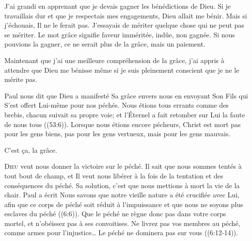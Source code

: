 J'ai grandi en apprenant que je devais gagner les bénédictions de Dieu.
 Si je travaillais dur et que je respectais mes engagements,
 Dieu allait me bénir. Mais si j'échouais, Il ne le ferait pas.
 J'essayais de mériter quelque chose qui ne peut pas se mériter.
 Le mot \Og grâce \Fg{} signifie \Og faveur imméritée, indûe,
 non gagnée. \Fg{} Si nous pouvions la gagner,
 ce ne serait plus de la grâce, mais un paiement.


Maintenant que j'ai une meilleure compréhension de la grâce,
 j'ai appris à attendre que Dieu me bénisse même si je suis pleinement
 conscient que je ne le mérite pas.

Paul nous dit que Dieu a manifesté Sa grâce envers nous en envoyant Son Fils
 qui S'est offert Lui-même pour nos péchés.
 \Og Nous étions tous errants comme des brebis, chacun suivait sa propre voie;
 et l'Éternel a fait retomber sur Lui la faute de nous tous \Fg{}
 ((53:6)).
 Lorsque nous étions encore pécheurs, Christ est mort
 \ocadr pas pour les gens biens, pas pour les gens vertueux,
 mais pour les gens mauvais.

C'est \c{c}a,  la grâce.

\dvrule






\lettrine{D}{ieu} veut nous donner la victoire sur le péché.
 Il sait que nous sommes tentés à tout bout de champ,
 et Il veut nous libérer à la fois de la tentation et des conséquences
 du péché. Sa solution, c'est que nous mettions à mort la vie de la chair.
 Paul a écrit\frcolon {}
 \Og Nous savons que notre vieille nature a été crucifiée avec Lui,
 afin que ce corps de péché soit réduit à l'impuissance
 et que nous ne soyons plus esclaves du péché \Fg{} ((6:6)).
 \Og Que le péché ne règne donc pas dans votre corps mortel,
 et n'obéissez pas à ses convoitises. Ne livrez pas vos membres au péché,
 comme armes pour l'injustice\dots{}
 Le péché ne dominera pas sur vous \Fg{} ((6:12-14)).


